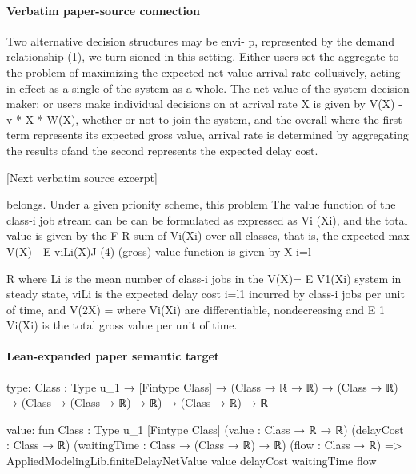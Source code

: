 \documentclass[10pt]{article}
\begin{document}
\paragraph{Verbatim paper-source connection}
\begin{ReviewVerbatim}
Two alternative decision structures may be envi-                   p, represented by the demand relationship (1), we turn
sioned in this setting. Either users set the aggregate                to the problem of maximizing the expected net value
arrival rate collusively, acting in effect as a single                of the system as a whole. The net value of the system
decision maker; or users make individual decisions on                 at arrival rate X is given by V(X) - v * X * W(X),
whether or not to join the system, and the overall                    where the first term represents its expected gross value,
arrival rate is determined by aggregating the results ofand the second represents the expected delay cost.

[Next verbatim source excerpt]

                                                                       belongs. Under a given prionity scheme, this problem
The value function of the class-i job stream can be                    can be formulated as
expressed as Vi (Xi), and the total value is given by the                        F       R
sum of Vi(Xi) over all classes, that is, the expected                   max V(X) - E viLi(X)J (4)
(gross) value function is given by                                          X        i=l


           R                                                           where Li is the mean number of class-i jobs in the
V(X)= E V1(Xi)                                                         system in steady state, viLi is the expected delay cost
           i=l1
                                                                       incurred by class-i jobs per unit of time, and V(2X) =
where Vi(Xi) are differentiable, nondecreasing and                     E 1 Vi(Xi) is the total gross value per unit of time.
\end{ReviewVerbatim}



\paragraph{Lean-expanded paper semantic target}
\begin{ReviewVerbatim}
type:
{Class : Type u_1} → [Fintype Class] → (Class → ℝ → ℝ) → (Class → ℝ) → (Class → (Class → ℝ) → ℝ) → (Class → ℝ) → ℝ

value:
fun {Class : Type u_1} [Fintype Class] (value : Class → ℝ → ℝ) (delayCost : Class → ℝ)
    (waitingTime : Class → (Class → ℝ) → ℝ) (flow : Class → ℝ) =>
  AppliedModelingLib.finiteDelayNetValue value delayCost waitingTime flow
\end{ReviewVerbatim}
\end{document}

